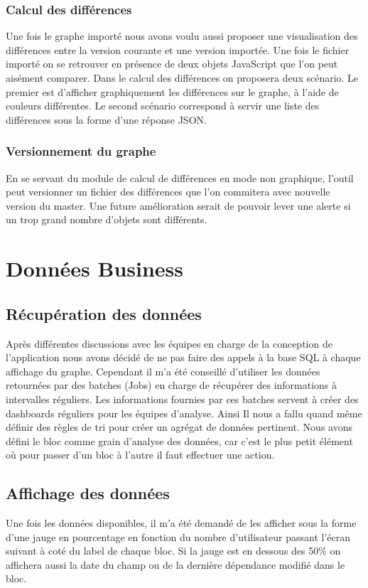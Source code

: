 \subsubsection{Calcul des différences}
Une fois le graphe importé nous avons voulu aussi proposer une visualisation des différences entre la version courante et une version importée. Une fois le fichier importé on se retrouver en présence de deux objets JavaScript que l'on peut aisément comparer. Dans le calcul des différences on proposera deux scénario. Le premier est d'afficher graphiquement les différences sur le graphe, à l'aide de couleurs différentes. Le second scénario correspond à servir une liste des différences sous la forme d'une réponse JSON.

\subsubsection{Versionnement du graphe}
En se servant du module de calcul de différences en mode non graphique, l'outil peut versionner un fichier des différences que l'on commitera avec nouvelle version du master. Une future amélioration serait de pouvoir lever une alerte si un trop grand nombre d'objets sont différents.

\clearpage
\section{Données Business}

\subsection{Récupération des données}
Après différentes discussions avec les équipes en charge de la conception de l’application nous avons décidé de ne pas faire des appels à la base SQL à chaque affichage du graphe.
Cependant il m'a été conseillé d'utiliser les données retournées par des batches (Jobs) en charge de récupérer des informations à intervalles réguliers. Les informations fournies par ces batches servent à créer des dashboards réguliers pour les équipes d'analyse. Ainsi Il nous a fallu quand même définir des règles de tri pour créer un agrégat de données pertinent. Nous avons défini le bloc comme grain d'analyse des données, car c'est le plus petit élément où pour passer d'un bloc à l'autre il faut effectuer une action.

\subsection{Affichage des données}
Une fois les données disponibles, il m'a été demandé de les afficher sous la forme d'une jauge en pourcentage en fonction du nombre d'utilisateur passant l'écran suivant à coté du label de chaque bloc. Si la jauge est en dessous des 50\% on affichera aussi la date du champ ou de la dernière dépendance modifié dans le bloc.